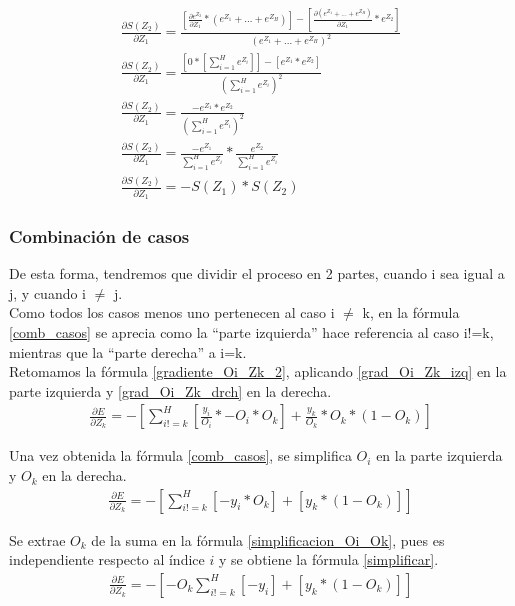 \begin{gather}
	\frac{\partial S(Z_2)}{\partial Z_1} = \frac{[\frac{\partial e^{Z_2}}{\partial Z_1} * (e^{Z_1} + ... + e^{Z_H}) ] - [\frac{\partial (e^{Z_1} + ... + e^{Z_H})}{\partial Z_1} * e^{Z_2} ] }{(e^{Z_1} + ... + e^{Z_H})^2} \\
	\frac{\partial S(Z_2)}{\partial Z_1} = \frac{[0 * [\sum_{i=1}^{H}  e^{Z_i}]] - [e^{Z_1} * e^{Z_2}]   }{ (\sum_{i=1}^{H}  e^{Z_i})^2} \\
	\frac{\partial S(Z_2)}{\partial Z_1} = \frac{-e^{Z_1} * e^{Z_2}  }{(\sum_{i=1}^{H}  e^{Z_i})^2} \\
	\frac{\partial S(Z_2)}{\partial Z_1} = \frac{-e^{Z_1}}{\sum_{i=1}^{H}  e^{Z_i}} * \frac{e^{Z_2}}{\sum_{i=1}^{H}  e^{Z_i}} \\
	\frac{\partial S(Z_2)}{\partial Z_1} = -S(Z_1) * S(Z_2)
	\label{grad_Oi_Zk_izq}
\end{gather}

\subsubsection{Combinación de casos}

De esta forma, tendremos que dividir  el proceso en 2 partes, cuando i sea igual a j, y cuando i $\neq$ j. \\
Como todos los casos menos uno pertenecen al caso i $\neq$ k, en la fórmula \ref{comb_casos} se aprecia como la ``parte izquierda'' hace referencia al caso i!=k, mientras que la ``parte derecha'' a i=k. \\
Retomamos la fórmula \ref{gradiente_Oi_Zk_2}, aplicando \ref{grad_Oi_Zk_izq} en la parte izquierda y \ref{grad_Oi_Zk_drch} en la derecha. \\
\begin{gather}
	\frac{\partial E}{\partial Z_k} = - [\sum_{i!=k}^{H} [\frac{y_i}{O_i} * -O_i * O_k ] + \frac{y_k}{O_k} * O_k * (1 - O_k)  ]
	\label{comb_casos}
\end{gather}

Una vez obtenida la fórmula \ref{comb_casos}, se simplifica $O_i$ en la parte izquierda y $O_k$ en la derecha. \\
\begin{gather}
	\frac{\partial E}{\partial Z_k} = - [\sum_{i!=k}^{H} [- y_i * O_k] + [y_k * (1 - O_k) ] ] 
	\label{simplificacion_Oi_Ok}
\end{gather}

Se extrae $O_k$ de la suma en la fórmula \ref{simplificacion_Oi_Ok}, pues es independiente respecto al índice $i$ y se obtiene la fórmula \ref{simplificar}.\\
\begin{gather}	
	\frac{\partial E}{\partial Z_k} = - [-O_k \sum_{i!=k}^{H}[-y_i] + [y_k * (1 - O_k) ] ]
	\label{simplificar}
\end{gather}

